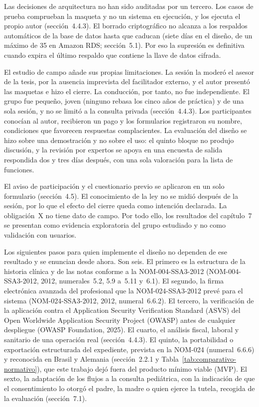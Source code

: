 \documentclass[12pt, a4paper]{article}
\begin{document}
Las decisiones de arquitectura no han sido auditadas por un tercero. Los
casos de prueba comprueban la maqueta y no un sistema en ejecución, y
los ejecuta el propio autor (sección~4.4.3). El borrado criptográfico no
alcanza a los respaldos automáticos de la base de datos hasta que
caducan (siete días en el diseño, de un máximo de 35 en Amazon RDS;
sección~5.1). Por eso la supresión es definitiva cuando expira el último
respaldo que contiene la llave de datos cifrada.

El estudio de campo añade sus propias limitaciones. La sesión la moderó
el asesor de la tesis, por la ausencia imprevista del facilitador
externo, y el autor presentó las maquetas e hizo el cierre. La
conducción, por tanto, no fue independiente. El grupo fue pequeño, joven
(ninguno rebasa los cinco años de práctica) y de una sola sesión, y no
se limitó a la consulta privada (sección~4.4.3). Los
participantes conocían al autor, recibieron un pago y los formularios
registraron su nombre, condiciones que favorecen respuestas
complacientes. La evaluación del diseño se hizo sobre una demostración y
no sobre el uso: el quinto bloque no produjo discusión, y la revisión
por expertos se apoya en una encuesta de salida respondida dos y tres
días después, con una sola valoración para la lista de funciones.

El aviso de participación y el cuestionario previo se aplicaron en un
solo formulario (sección~4.5). El conocimiento de la ley no se midió
después de la sesión, por lo que el efecto del cierre queda como
intención declarada. La obligación~X no tiene dato de campo. Por todo
ello, los resultados del capítulo~7 se presentan como evidencia
exploratoria del grupo estudiado y no como validación con usuarios.
 
Los siguientes pasos para quien implemente el diseño no dependen de ese
resultado y se enuncian desde ahora. Son seis. El primero es la
estructura de la historia clínica y de las notas conforme a la
NOM-004-SSA3-2012 (NOM-004-SSA3-2012, 2012, numerales~5.2, 5.9 a~5.11
y~6.1). El segundo, la firma electrónica avanzada del profesional que la
NOM-024-SSA3-2012 prevé para el sistema (NOM-024-SSA3-2012, 2012,
numeral~6.6.2). El tercero, la verificación de la aplicación contra el
Application Security Verification Standard (ASVS) del Open Worldwide
Application Security Project (OWASP) antes de cualquier despliegue
(OWASP Foundation, 2025). El cuarto, el análisis fiscal, laboral y
sanitario de una operación real (sección~4.4.3). El quinto, la
portabilidad o exportación estructurada del expediente, prevista en la
NOM-024 (numeral~6.6.6) y reconocida en Brasil y Alemania (sección~2.2.1
y Tabla~\ref{tab:comparativo-normativo}), que este trabajo dejó fuera
del producto mínimo viable (MVP). El sexto, la adaptación de los flujos
a la consulta pediátrica, con la indicación de que el consentimiento lo
otorgó el padre, la madre o quien ejerce la tutela, recogida de la
evaluación (sección~7.1).
 
\end{document}
